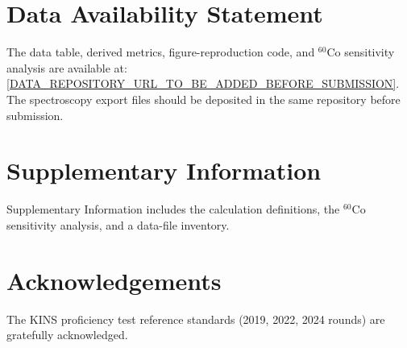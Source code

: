 \documentclass[preprint,12pt]{elsarticle}
\begin{document}
\section*{Data Availability Statement}
The data table, derived metrics, figure-reproduction code, and
$^{60}$Co sensitivity analysis are available at:
\url{[DATA_REPOSITORY_URL_TO_BE_ADDED_BEFORE_SUBMISSION]}.
The spectroscopy export files should be deposited in the same repository
before submission.

\section*{Supplementary Information}
Supplementary Information includes the calculation definitions,
the $^{60}$Co sensitivity analysis, and a data-file inventory.

\section*{Acknowledgements}
The KINS proficiency test reference standards (2019, 2022, 2024 rounds)
are gratefully acknowledged.
\end{document}
